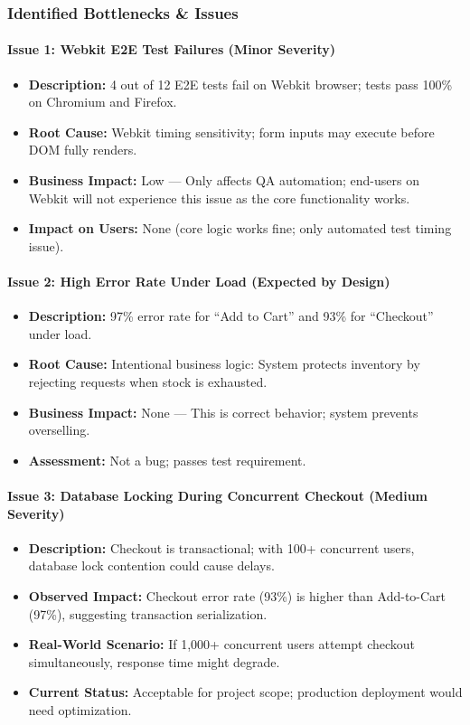\documentclass[11pt,a4paper]{article}
\begin{document}
\subsubsection{Identified Bottlenecks \& Issues}

\paragraph{Issue 1: Webkit E2E Test Failures (Minor Severity)}
\begin{itemize}
    \item \textbf{Description:} 4 out of 12 E2E tests fail on Webkit browser; tests pass 100\% on Chromium and Firefox.
    \item \textbf{Root Cause:} Webkit timing sensitivity; form inputs may execute before DOM fully renders.
    \item \textbf{Business Impact:} Low — Only affects QA automation; end-users on Webkit will not experience this issue as the core functionality works.
    \item \textbf{Impact on Users:} None (core logic works fine; only automated test timing issue).
\end{itemize}

\paragraph{Issue 2: High Error Rate Under Load (Expected by Design)}
\begin{itemize}
    \item \textbf{Description:} 97\% error rate for ``Add to Cart'' and 93\% for ``Checkout'' under load.
    \item \textbf{Root Cause:} Intentional business logic: System protects inventory by rejecting requests when stock is exhausted.
    \item \textbf{Business Impact:} None — This is correct behavior; system prevents overselling.
    \item \textbf{Assessment:} \checkmark Not a bug; passes test requirement.
\end{itemize}

\paragraph{Issue 3: Database Locking During Concurrent Checkout (Medium Severity)}
\begin{itemize}
    \item \textbf{Description:} Checkout is transactional; with 100+ concurrent users, database lock contention could cause delays.
    \item \textbf{Observed Impact:} Checkout error rate (93\%) is higher than Add-to-Cart (97\%), suggesting transaction serialization.
    \item \textbf{Real-World Scenario:} If 1,000+ concurrent users attempt checkout simultaneously, response time might degrade.
    \item \textbf{Current Status:} Acceptable for project scope; production deployment would need optimization.
\end{itemize}
\end{document}
